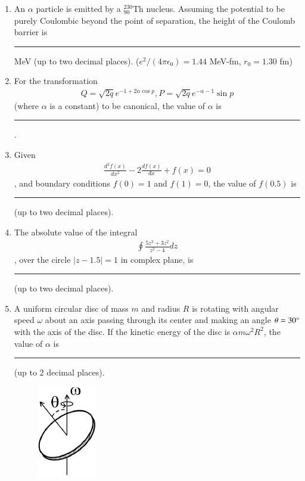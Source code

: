 \documentclass[journal,12pt,onecolumn]{IEEEtran}
\theoremstyle{remark}
\begin{document}
\begin{enumerate}
    \item An $\alpha$ particle is emitted by a ${}^{230}_{90}\text{Th}$ nucleus. Assuming the potential to be purely Coulombic beyond the point of separation, the height of the Coulomb barrier is \rule{1.5cm}{0.4pt} MeV (up to two decimal places). ($e^2/(4\pi\epsilon_0) = 1.44$ MeV-fm, $r_0 = 1.30$ fm)\hfill{}

    \item For the transformation \begin{align*} Q = \sqrt{2q} e^{-1+2\alpha\cos p}, P = \sqrt{2q} e^{-\alpha-1}\sin p\end{align*} (where $\alpha$ is a constant) to be canonical, the value of $\alpha$ is \rule{1.5cm}{0.4pt}.\hfill{}

    \item Given \begin{align*}\frac{d^2f(x)}{dx^2} - 2\frac{df(x)}{dx} + f(x) = 0\end{align*}, and boundary conditions $f(0)=1$ and $f(1)=0$, the value of $f(0.5)$ is \rule{1.5cm}{0.4pt} (up to two decimal places).\hfill{}

    \item The absolute value of the integral \begin{align*}\oint \frac{5z^3 + 3z^2}{z^2-4} dz\end{align*}, over the circle $|z-1.5|=1$ in complex plane, is \rule{1.5cm}{0.4pt} (up to two decimal places).\hfill{}

    \item A uniform circular disc of mass $m$ and radius $R$ is rotating with angular speed $\omega$ about an axis passing through its center and making an angle $\theta=30\degree$ with the axis of the disc. If the kinetic energy of the disc is $\alpha m \omega^2 R^2$, the value of $\alpha$ is \rule{1.5cm}{0.4pt} (up to 2 decimal places).
    \begin{figure}[H]
        \centering
        \caption*{} \label{fig:56} \includegraphics{figs/56.png}
    \end{figure}\hfill{}


\end{enumerate}
\end{document}

